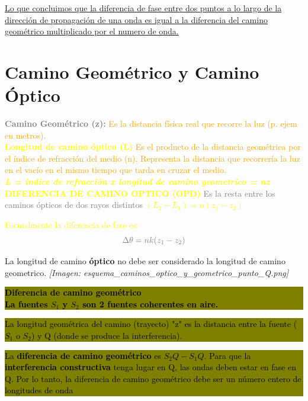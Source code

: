 \documentclass[12pt]{article}
\begin{document}
	\underline{Lo que concluimos que la diferencia de fase entre dos puntos a lo largo de la} \underline{dirección de propagación de una onda es igual a la diferencia del camino} \underline{geométrico multiplicado por el numero de onda.}
	
	\section{Camino Geométrico y Camino Óptico}
	
	\textcolor{gray}{\textbf{Camino Geométrico (z):}} \textcolor{orange}{Es la distancia física real que recorre la luz (p. ejem en metros).} \\
	\textcolor{yellow}{\textbf{Longitud de camino óptico (L)}} \textcolor{orange}{Es el producto de la distancia geométrica por el índice de refracción del medio (n). Representa la distancia que recorrería la luz en el vacío en el mismo tiempo que tarda en cruzar el medio.} \\
	\textcolor{yellow}{\textbf{\textit{L = indice de refracción x longitud de camino geometrico = nz}}} \\
	\textcolor{yellow}{\textbf{DIFERENCIA DE CAMINO OPTICO (OPD)}} \textcolor{gray}{Es la resta entre los caminos ópticos de dos rayos distintos} \textcolor{yellow}{\textbf{$(L_2 - L_1) = n(z_1 - z_2)$}}
	
	\textcolor{yellow}{Formalmente la diferencia de fase es:}
	\begin{equation*}
		\textcolor{gray}{\Delta\theta = nk(z_1 - z_2)}
	\end{equation*}
	
	La longitud de camino \textbf{óptico} no debe ser considerado la longitud de camino geometrico.
	\textit{[Imagen: esquema\_caminos\_optico\_y\_geometrico\_punto\_Q.png]}
	
	\colorbox{olive}{\parbox{0.45\textwidth}{\textcolor{black}{\textbf{Diferencia de camino geométrico} \\ \textbf{La fuentes $S_1$ y $S_2$ son 2 fuentes coherentes en aire.}}}}
	
	\colorbox{olive}{\parbox{0.4\textwidth}{\textcolor{black}{La longitud geométrica del camino (trayecto) "z" es la distancia entre la fuente ($S_1$ o $S_2$) y Q (donde se produce la interferencia).}}}
	\hfill
	\colorbox{olive}{\parbox{0.5\textwidth}{\textcolor{black}{La \textbf{diferencia de camino geométrico} es \textbf{$S_2Q - S_1Q$}. Para que la \textbf{interferencia constructiva} tenga lugar en Q, las ondas deben estar en fase en Q. Por lo tanto, la diferencia de camino geométrico debe ser un número entero de longitudes de onda}}}
	
\end{document}
